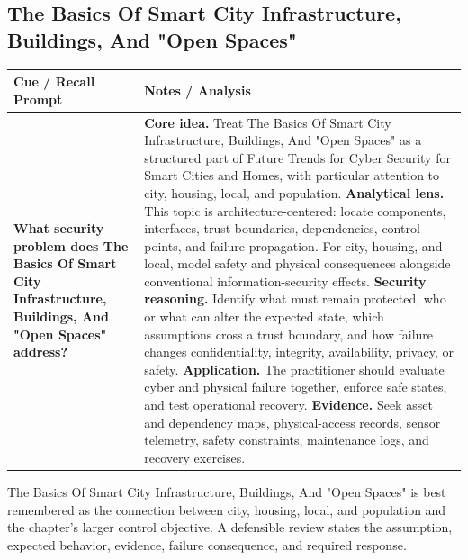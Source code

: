 \documentclass[11pt]{article}
\newcommand{\CornellHeader}{%
\rowcolor{Navy}\color{white}\bfseries Cue / Recall Prompt & \color{white}\bfseries Notes / Analysis\\\hline}
\newcommand{\CornellRow}[2]{%
\cellcolor{CueGray}\RaggedRight\textbf{#1} & \RaggedRight #2\\\hline}
\begin{document}
\subsection*{The Basics Of Smart City Infrastructure, Buildings, And "Open Spaces"}
\begin{longtable}{>{\RaggedRight\arraybackslash}p{}|>{\RaggedRight\arraybackslash}p{}}
\CornellHeader
\CornellRow{What security problem does The Basics Of Smart City Infrastructure, Buildings, And "Open Spaces" address?}{\textbf{Core idea.} Treat The Basics Of Smart City Infrastructure, Buildings, And "Open Spaces" as a structured part of Future Trends for Cyber Security for Smart Cities and Homes, with particular attention to city, housing, local, and population. \textbf{Analytical lens.} This topic is architecture-centered: locate components, interfaces, trust boundaries, dependencies, control points, and failure propagation. For city, housing, and local, model safety and physical consequences alongside conventional information-security effects. \textbf{Security reasoning.} Identify what must remain protected, who or what can alter the expected state, which assumptions cross a trust boundary, and how failure changes confidentiality, integrity, availability, privacy, or safety. \textbf{Application.} The practitioner should evaluate cyber and physical failure together, enforce safe states, and test operational recovery. \textbf{Evidence.} Seek asset and dependency maps, physical-access records, sensor telemetry, safety constraints, maintenance logs, and recovery exercises.}
\end{longtable}
\begin{topicsummary}
The Basics Of Smart City Infrastructure, Buildings, And "Open Spaces" is best remembered as the connection between city, housing, local, and population and the chapter's larger control objective. A defensible review states the assumption, expected behavior, evidence, failure consequence, and required response.
\end{topicsummary}
\end{document}
